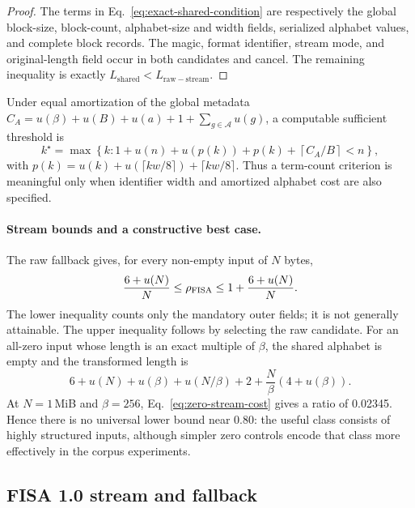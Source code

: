 \documentclass[a4paper,fleqn]{cas-dc}
\begin{document}
\begin{proof}
The terms in Eq.~\eqref{eq:exact-shared-condition} are respectively the
global block-size, block-count, alphabet-size and width fields, serialized
alphabet values, and complete block records. The magic, format identifier,
stream mode, and original-length field occur in both candidates and cancel.
The remaining inequality is exactly
$L_{\mathrm{shared}}<L_{\mathrm{raw-stream}}$.
\end{proof}

Under equal amortization of the global metadata
$C_A=u(\beta)+u(B)+u(a)+1+\sum_{g\in\mathcal{A}}u(g)$, a computable sufficient threshold is
\begin{equation}
k^\star=\max\left\{k:
1+u(n)+u(p(k))+p(k)+\left\lceil C_A/B\right\rceil<n\right\},
\label{eq:k-threshold}
\end{equation}
with $p(k)=u(k)+u(\lceil kw/8\rceil)+\lceil kw/8\rceil$. Thus a term-count
criterion is meaningful only when identifier width and amortized alphabet
cost are also specified.

\paragraph{Stream bounds and a constructive best case.}
The raw fallback gives, for every non-empty input of $N$ bytes,
\begin{equation}
\frac{6+u(N)}{N}\leq \rho_{\rm FISA}
\leq 1+\frac{6+u(N)}{N}.
\label{eq:fisa-universal-bounds}
\end{equation}
The lower inequality counts only the mandatory outer fields; it is not
generally attainable. The upper inequality follows by selecting the raw
candidate. For an all-zero input whose length is an exact multiple of
$\beta$, the shared alphabet is empty and the transformed length is
\begin{equation}
6+u(N)+u(\beta)+u(N/\beta)+2+
\frac{N}{\beta}\left(4+u(\beta)\right).
\label{eq:zero-stream-cost}
\end{equation}
At $N=1$\,MiB and $\beta=256$, Eq.~\eqref{eq:zero-stream-cost} gives a ratio
of 0.02345. Hence there is no universal lower bound near 0.80: the useful
class consists of highly structured inputs, although simpler zero controls
encode that class more effectively in the corpus experiments.

\subsection{FISA 1.0 stream and fallback}
\end{document}
